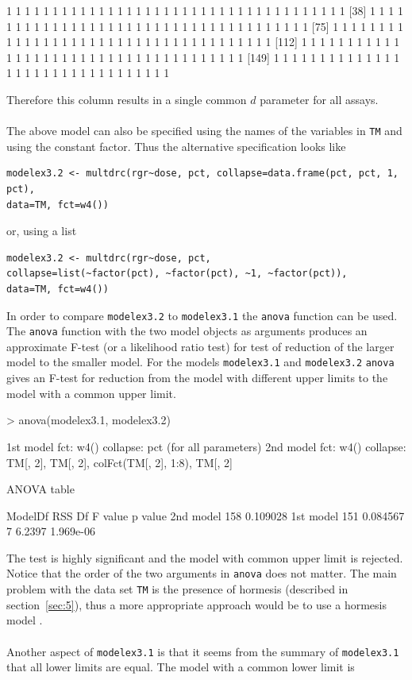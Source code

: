 \documentclass[a4paper]{article}
\begin{document}
\begin{Schunk}
\begin{Soutput}
  [1] 1 1 1 1 1 1 1 1 1 1 1 1 1 1 1 1 1 1 1 1 1 1 1 1 1 1 1 1 1 1 1 1 1 1 1 1 1
 [38] 1 1 1 1 1 1 1 1 1 1 1 1 1 1 1 1 1 1 1 1 1 1 1 1 1 1 1 1 1 1 1 1 1 1 1 1 1
 [75] 1 1 1 1 1 1 1 1 1 1 1 1 1 1 1 1 1 1 1 1 1 1 1 1 1 1 1 1 1 1 1 1 1 1 1 1 1
[112] 1 1 1 1 1 1 1 1 1 1 1 1 1 1 1 1 1 1 1 1 1 1 1 1 1 1 1 1 1 1 1 1 1 1 1 1 1
[149] 1 1 1 1 1 1 1 1 1 1 1 1 1 1 1 1 1 1 1 1 1 1 1 1 1 1 1 1 1 1 1 1
\end{Soutput}
\end{Schunk}
Therefore this column results in a single common $d$ parameter for all assays.
\\
\\
The above model can also be specified using the names of the variables in \verb+TM+ and using the constant factor. Thus
the alternative specification looks like

\begin{verbatim}
modelex3.2 <- multdrc(rgr~dose, pct, collapse=data.frame(pct, pct, 1, pct),
data=TM, fct=w4())
\end{verbatim}
or, using a list

\begin{verbatim}
modelex3.2 <- multdrc(rgr~dose, pct, 
collapse=list(~factor(pct), ~factor(pct), ~1, ~factor(pct)),
data=TM, fct=w4())
\end{verbatim}
In order to compare \verb+modelex3.2+ to \verb+modelex3.1+ the \verb+anova+ function can be used.
The \verb+anova+ function with the two model objects as arguments produces an approximate F-test (or a likelihood ratio test) for test of reduction 
of the
larger model to the smaller model. For the models \verb+modelex3.1+ and \verb+modelex3.2+ \verb+anova+ gives an F-test for reduction from the model
with different upper limits to the model with a common upper limit.

\begin{Schunk}
\begin{Sinput}
> anova(modelex3.1, modelex3.2)
\end{Sinput}
\begin{Soutput}
1st model
 fct:      w4()
 collapse: pct (for all parameters)
2nd model
 fct:      w4()
 collapse: TM[, 2], TM[, 2], colFct(TM[, 2], 1:8), TM[, 2]

ANOVA table

          ModelDf      RSS  Df F value   p value
2nd model     158 0.109028                      
1st model     151 0.084567   7  6.2397 1.969e-06
\end{Soutput}
\end{Schunk}
The test is highly significant and the model with common upper limit is rejected. Notice that the order of the two arguments in \verb+anova+ does not matter.
The main problem with the data set \verb+TM+ is the presence of hormesis (described in section~\ref{sec:5}), thus a more appropriate approach 
would be to use a hormesis model \citep{cedergreen&ritz&streibig:2005}.
\\
\\
Another aspect of \verb+modelex3.1+ is that it seems from the summary of \verb+modelex3.1+ that all lower limits are equal. The model with a common lower limit is
\end{document}
